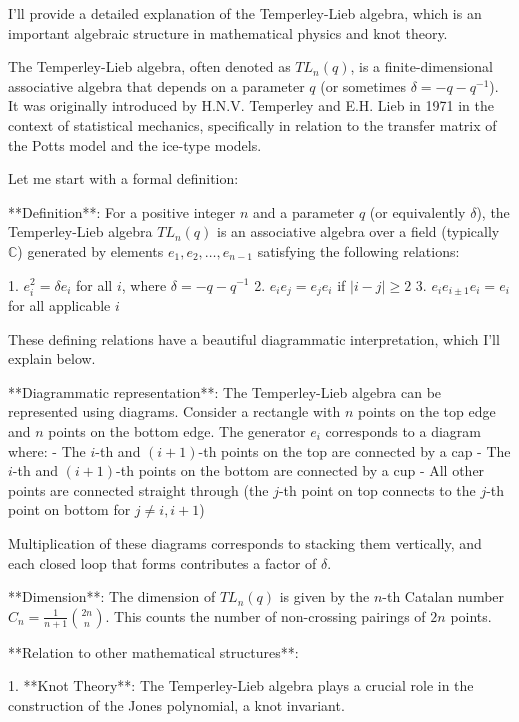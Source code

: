 \documentclass[12p]{article}
\newcounter{reasoningcounter}
\newenvironment{reasoning}[1][]
{\refstepcounter{reasoningcounter}%
\begin{tcolorbox}[
    title=Reasoning \thereasoningcounter: #1,
    colback=white, %
    colframe=gray,
    coltext=black, %
    fonttitle=\bfseries\normalsize,
    top=2mm,
    bottom=2mm,
    enlarge top initially by=5mm
]
\small
}
{\end{tcolorbox}}
\begin{document}
\begin{reasoning}
I'll provide a detailed explanation of the Temperley-Lieb algebra, which is an important algebraic structure in mathematical physics and knot theory.

The Temperley-Lieb algebra, often denoted as $TL_n(q)$, is a finite-dimensional associative algebra that depends on a parameter $q$ (or sometimes $\delta = -q - q^{-1}$). It was originally introduced by H.N.V. Temperley and E.H. Lieb in 1971 in the context of statistical mechanics, specifically in relation to the transfer matrix of the Potts model and the ice-type models.

Let me start with a formal definition:

**Definition**: For a positive integer $n$ and a parameter $q$ (or equivalently $\delta$), the Temperley-Lieb algebra $TL_n(q)$ is an associative algebra over a field (typically $\mathbb{C}$) generated by elements $e_1, e_2, \ldots, e_{n-1}$ satisfying the following relations:

1. $e_i^2 = \delta e_i$ for all $i$, where $\delta = -q - q^{-1}$
2. $e_i e_j = e_j e_i$ if $|i - j| \geq 2$
3. $e_i e_{i\pm 1} e_i = e_i$ for all applicable $i$

These defining relations have a beautiful diagrammatic interpretation, which I'll explain below.

**Diagrammatic representation**:
The Temperley-Lieb algebra can be represented using diagrams. Consider a rectangle with $n$ points on the top edge and $n$ points on the bottom edge. The generator $e_i$ corresponds to a diagram where:
- The $i$-th and $(i+1)$-th points on the top are connected by a cap
- The $i$-th and $(i+1)$-th points on the bottom are connected by a cup
- All other points are connected straight through (the $j$-th point on top connects to the $j$-th point on bottom for $j \neq i, i+1$)

Multiplication of these diagrams corresponds to stacking them vertically, and each closed loop that forms contributes a factor of $\delta$.

**Dimension**:
The dimension of $TL_n(q)$ is given by the $n$-th Catalan number $C_n = \frac{1}{n+1} \binom{2n}{n}$. This counts the number of non-crossing pairings of $2n$ points.

**Relation to other mathematical structures**:

1. **Knot Theory**: The Temperley-Lieb algebra plays a crucial role in the construction of the Jones polynomial, a knot invariant.


\end{reasoning}
\end{document}
